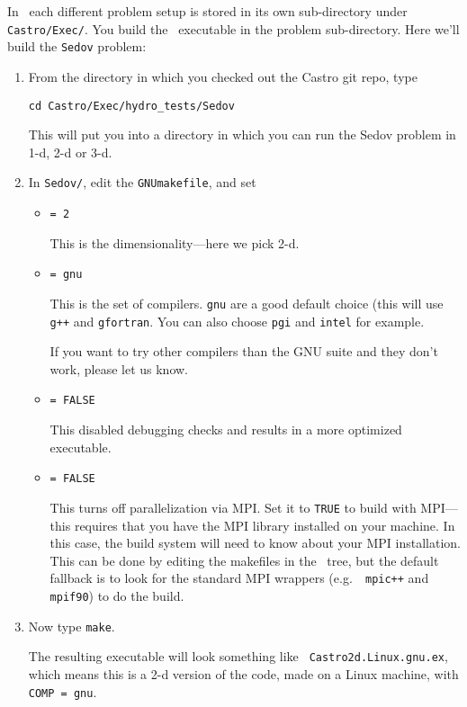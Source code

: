 In \castro\ each different problem setup is stored in its own
sub-directory under {\tt Castro/Exec/}.  You build the
\castro\ executable in the problem sub-directory.  Here we'll
build the {\tt Sedov} problem:

\begin{enumerate}

\item From the directory in which you checked out the Castro git repo,
  type
\begin{verbatim}
cd Castro/Exec/hydro_tests/Sedov
\end{verbatim}
This will put you into a directory in which you can run the Sedov
problem in 1-d, 2-d or 3-d.

\item In {\tt Sedov/}, edit the {\tt GNUmakefile}, and set
  \begin{itemize}
    \item {} {\tt = 2} 

      This is the dimensionality---here we pick 2-d.

    \item {} {\tt = gnu}

      This is the set of compilers.  {\tt gnu} are a good default
      choice (this will use {\tt g++} and {\tt gfortran}.  You can
      also choose {\tt pgi} and {\tt intel} for example.

      If you want to try other compilers than the GNU suite and they
      don't work, please let us know.

    \item {} {\tt = FALSE}

      This disabled debugging checks and results in a more
      optimized executable.

    \item {} {\tt = FALSE}

      This turns off parallelization via MPI.  Set it to {\tt TRUE} to
      build with MPI---this requires that you have the MPI library
      installed on your machine.  In this case, the build system will
      need to know about your MPI installation.  This can be done by
      editing the makefiles in the \amrex\ tree, but the default
      fallback is to look for the standard MPI wrappers (e.g.\ {\tt
        mpic++} and {\tt mpif90}) to do the build.

  \end{itemize}

\item Now type {\tt make}.

  The resulting executable will look something like {\tt
    Castro2d.Linux.gnu.ex}, which means this is a 2-d version
  of the code, made on a Linux machine, with {\tt COMP = gnu}.

\end{enumerate}

